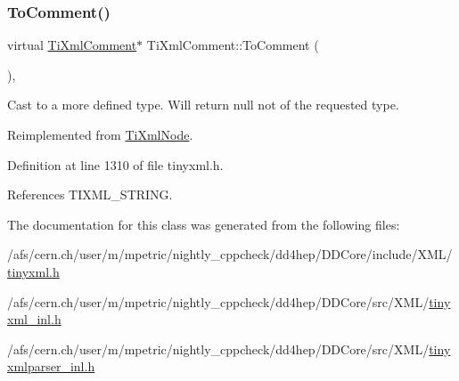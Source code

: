 \subsubsection{\texorpdfstring{To\+Comment()}{ToComment()}\hspace{0.1cm}{\footnotesize\ttfamily [2/2]}}
{\footnotesize\ttfamily virtual \hyperlink{class_ti_xml_comment}{Ti\+Xml\+Comment}$\ast$ Ti\+Xml\+Comment\+::\+To\+Comment (\begin{DoxyParamCaption}{ }\end{DoxyParamCaption})\hspace{0.3cm}{\ttfamily [inline]}, {\ttfamily [virtual]}}



Cast to a more defined type. Will return null not of the requested type. 



Reimplemented from \hyperlink{class_ti_xml_node_a383e06a0787f7063953934867990f849}{Ti\+Xml\+Node}.



Definition at line 1310 of file tinyxml.\+h.



References T\+I\+X\+M\+L\+\_\+\+S\+T\+R\+I\+NG.



The documentation for this class was generated from the following files\+:\begin{DoxyCompactItemize}
\item 
/afs/cern.\+ch/user/m/mpetric/nightly\+\_\+cppcheck/dd4hep/\+D\+D\+Core/include/\+X\+M\+L/\hyperlink{tinyxml_8h}{tinyxml.\+h}\item 
/afs/cern.\+ch/user/m/mpetric/nightly\+\_\+cppcheck/dd4hep/\+D\+D\+Core/src/\+X\+M\+L/\hyperlink{tinyxml__inl_8h}{tinyxml\+\_\+inl.\+h}\item 
/afs/cern.\+ch/user/m/mpetric/nightly\+\_\+cppcheck/dd4hep/\+D\+D\+Core/src/\+X\+M\+L/\hyperlink{tinyxmlparser__inl_8h}{tinyxmlparser\+\_\+inl.\+h}\end{DoxyCompactItemize}
